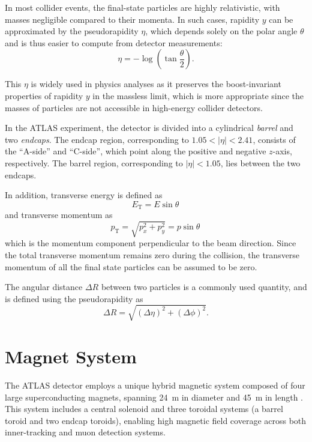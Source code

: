In most collider events, the final-state particles are highly relativistic, with masses negligible compared to their momenta. In such cases, rapidity \(y\) can be approximated by the pseudorapidity \(\eta\), which depends solely on the polar angle \(\theta\) and is thus easier to compute from detector measurements:
\begin{equation}
  \eta = -\log\left( \tan \frac{\theta}{2} \right).
  \label{eq:pseudorapidity}
\end{equation}

This \(\eta\) is widely used in physics analyses as it preserves the boost-invariant properties of rapidity \(y\) in the massless limit, which is more appropriate since the masses of particles are not accessible in high-energy collider detectors.

In the ATLAS experiment, the detector is divided into a cylindrical \textit{barrel} and two \textit{endcaps}. The endcap region, corresponding to $1.05 < |\eta| < 2.41$, consists of the ``A-side'' and ``C-side'', which point along the positive and negative \(z\)-axis, respectively. The barrel region, corresponding to $|\eta| < 1.05$, lies between the two endcaps.

In addition, transverse energy is defined as 
\[
  E_{\mathrm{T}} = E \sin \theta\,
\]
and transverse momentum as
\[
  p_{\mathrm{T}} = \sqrt{p_x^2 + p_y^2} = p \sin \theta\,
\]
which is the momentum component perpendicular to the beam direction. Since the total transverse momentum remains zero during the collision, the transverse momentum of all the final state particles can be assumed to be zero.

The angular distance \(\Delta R\) between two particles is a commonly used quantity, and is defined using the pseudorapidity as
\begin{equation}
  \Delta R = \sqrt{(\Delta \eta)^2 + (\Delta \phi)^2}.
  \label{eq:deltaR}
\end{equation}
\section{Magnet System} \label{sec:MagnetSystem}
The ATLAS detector employs a unique hybrid magnetic system composed of four large superconducting magnets, spanning 24~m in diameter and 45~m in length \cite{ATLASDetector2008}. This system includes a central solenoid and three toroidal systems (a barrel toroid and two endcap toroids), enabling high magnetic field coverage across both inner-tracking and muon detection systems.

